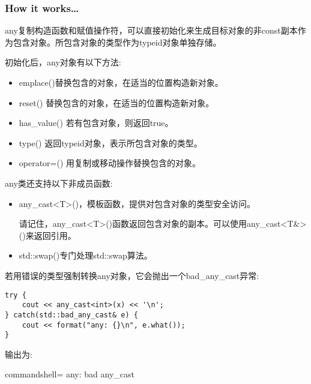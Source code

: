 \subsubsection{How it works…}

any复制构造函数和赋值操作符，可以直接初始化来生成目标对象的非const副本作为包含对象。所包含对象的类型作为typeid对象单独存储。

初始化后，any对象有以下方法:

\begin{itemize}
\item 
emplace()替换包含的对象，在适当的位置构造新对象。

\item 
reset() 替换包含的对象，在适当的位置构造新对象。

\item 
has\_value() 若有包含对象，则返回true。

\item 
type() 返回typeid对象，表示所包含对象的类型。

\item 
operator=() 用复制或移动操作替换包含的对象。
\end{itemize}

any类还支持以下非成员函数:

\begin{itemize}
\item 
any\_cast<T>()，模板函数，提供对包含对象的类型安全访问。

请记住，any\_cast<T>()函数返回包含对象的副本。可以使用any\_cast<T\&>()来返回引用。

\item 
std::swap()专门处理std::swap算法。
\end{itemize}

若用错误的类型强制转换any对象，它会抛出一个bad\_any\_cast异常:

\begin{lstlisting}[style=styleCXX]
try {
	cout << any_cast<int>(x) << '\n';
} catch(std::bad_any_cast& e) {
	cout << format("any: {}\n", e.what());
}
\end{lstlisting}

输出为:

\begin{tcblisting}{commandshell={}}
any: bad any_cast
\end{tcblisting}

















